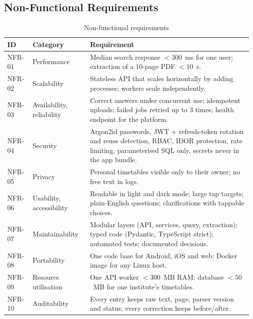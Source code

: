 \subsection{Non-Functional Requirements}
\begin{table}[H]
\centering
\caption{Non-functional requirements}
\label{tab:nfr}
\small
\begin{tabularx}{\textwidth}{@{}p{1.3cm}p{2.7cm}X@{}}
\toprule
\textbf{ID} & \textbf{Category} & \textbf{Requirement}\\
\midrule
NFR-01 & Performance & Median search response $<300$~ms for one user; extraction of a 10-page PDF $<10$~s.\\
NFR-02 & Scalability & Stateless API that scales horizontally by adding processes; workers scale independently.\\
NFR-03 & Availability, reliability & Correct answers under concurrent use; idempotent uploads; failed jobs retried up to 3 times; health endpoint for the platform.\\
NFR-04 & Security & Argon2id passwords, JWT + refresh-token rotation and reuse detection, RBAC, IDOR protection, rate limiting, parameterised SQL only, secrets never in the app bundle.\\
NFR-05 & Privacy & Personal timetables visible only to their owner; no free text in logs.\\
NFR-06 & Usability, accessibility & Readable in light and dark mode; large tap targets; plain-English questions; clarifications with tappable choices.\\
NFR-07 & Maintainability & Modular layers (API, services, query, extraction); typed code (Pydantic, TypeScript strict); automated tests; documented decisions.\\
NFR-08 & Portability & One code base for Android, iOS and web; Docker image for any Linux host.\\
NFR-09 & Resource utilisation & One API worker $<300$~MB RAM; database $<50$~MB for one institute's timetables.\\
NFR-10 & Auditability & Every entry keeps raw text, page, parser version and status; every correction keeps before/after.\\
\bottomrule
\end{tabularx}
\end{table}


